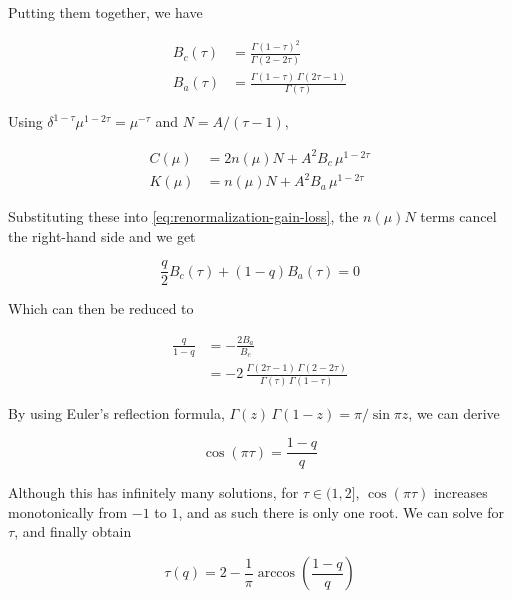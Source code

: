 \documentclass[aps, pre, reprint]{revtex4-2}
\begin{document}
Putting them together, we have

\begin{align}
    B_c(\tau)&=\frac{\Gamma(1-\tau)^2}{\Gamma(2-2\tau)} \\
    B_a(\tau)&=\frac{\Gamma(1-\tau)\,\Gamma(2\tau-1)}{\Gamma(\tau)}
\end{align}

Using $\delta^{1-\tau}\mu^{1-2\tau}=\mu^{-\tau}$ and $N=A/(\tau-1)$,

\begin{align}
    C(\mu)&=2n(\mu)N + A^2B_c\,\mu^{1-2\tau} \\
    K(\mu)&=n(\mu)N + A^2B_a\,\mu^{1-2\tau}
\end{align}

Substituting these into  \autoref{eq:renormalization-gain-loss}, the $n(\mu)N$ terms cancel the right-hand side and we get

\begin{equation}
    \frac{q}{2}B_c(\tau) + (1-q)B_a(\tau) = 0 
\end{equation}

Which can then be reduced to 

\begin{align}
    \frac{q}{1-q} &= - \frac{2B_a}{B_c} \\
    &= -2\,\frac{\Gamma(2\tau-1)\,\Gamma(2-2\tau)}{\Gamma(\tau)\,\Gamma(1-\tau)}
\end{align}

By using Euler's reflection formula, $\Gamma(z)\,\Gamma(1-z)=\pi/\sin\pi z$, we can derive

\begin{equation}
    \cos(\pi \tau) = \frac{1-q}q
\end{equation}

Although this has infinitely many solutions, for $\tau \in (1, 2]$, $\cos(\pi\tau)$ increases monotonically from $-1$ to $1$, and as such there is only one root. We can solve for $\tau$, and finally obtain

\begin{equation}
    \tau(q) = 2 - \frac1\pi \arccos\left(\frac{1-q}{q}\right)
\end{equation}
\end{document}

